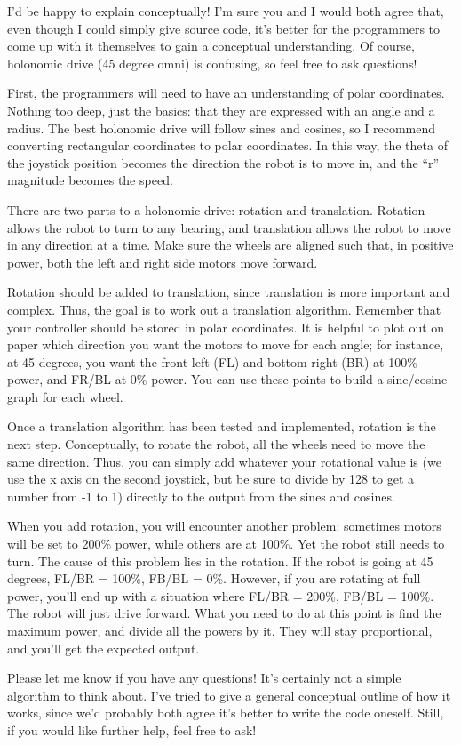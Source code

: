 \begin{fancyquotes}
I'd be happy to explain conceptually! I'm sure you and I would both agree that, even though I could simply give source code, it's better for the programmers to come up with it themselves to gain a conceptual understanding. Of course, holonomic drive (45 degree omni) is confusing, so feel free to ask questions!

First, the programmers will need to have an understanding of polar coordinates. Nothing too deep, just the basics: that they are expressed with an angle and a radius. The best holonomic drive will follow sines and cosines, so I recommend converting rectangular coordinates to polar coordinates. In this way, the theta of the joystick position becomes the direction the robot is to move in, and the ``r'' magnitude becomes the speed.

There are two parts to a holonomic drive: rotation and translation. Rotation allows the robot to turn to any bearing, and translation allows the robot to move in any direction at a time. Make sure the wheels are aligned such that, in positive power, both the left and right side motors move forward.

Rotation should be added to translation, since translation is more important and complex. Thus, the goal is to work out a translation algorithm. Remember that your controller should be stored in polar coordinates. It is helpful to plot out on paper which direction you want the motors to move for each angle; for instance, at 45 degrees, you want the front left (FL) and bottom right (BR) at 100\% power, and FR/BL at 0\% power. You can use these points to build a sine/cosine graph for each wheel. 

Once a translation algorithm has been tested and implemented, rotation is the next step. Conceptually, to rotate the robot, all the wheels need to move the same direction. Thus, you can simply add whatever your rotational value is (we use the x axis on the second joystick, but be sure to divide by 128 to get a number from -1 to 1) directly to the output from the sines and cosines.

When you add rotation, you will encounter another problem: sometimes motors will be set to 200\% power, while others are at 100\%. Yet the robot still needs to turn. The cause of this problem lies in the rotation. If the robot is going at 45 degrees, FL/BR = 100\%, FB/BL = 0\%. However, if you are rotating at full power, you'll end up with a situation where FL/BR = 200\%, FB/BL = 100\%. The robot will just drive forward. What you need to do at this point is find the maximum power, and divide all the powers by it. They will stay proportional, and you'll get the expected output.

Please let me know if you have any questions! It's certainly not a simple algorithm to think about. I've tried to give a general conceptual outline of how it works, since we'd probably both agree it's better to write the code oneself. Still, if you would like further help, feel free to ask!
\end{fancyquotes}

